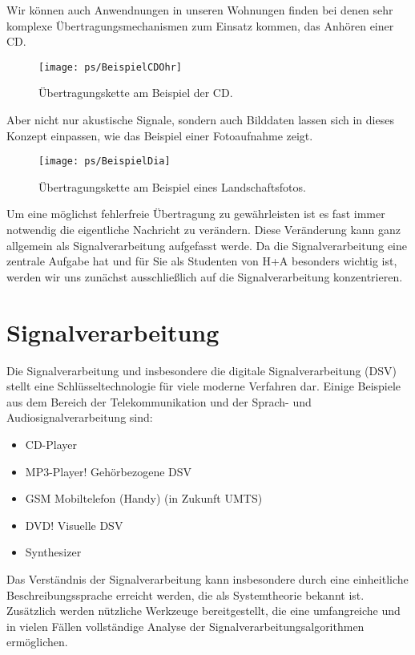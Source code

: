 Wir können auch Anwendnungen in unseren Wohnungen finden bei denen sehr komplexe
Übertragungsmechanismen zum Einsatz kommen, \zB das Anhören einer
CD.
\begin{figure}[H]
\begin{center}
\texttt{[image: ps/BeispielCDOhr]}
\caption{\label{pic:BeispielCDOhr} Übertragungskette am Beispiel
der CD.}
\end{center}
\end{figure}

Aber nicht nur akustische Signale, sondern auch Bilddaten lassen sich in dieses Konzept einpassen,
wie das Beispiel einer Fotoaufnahme zeigt.
\begin{figure}[H]
\begin{center}
\texttt{[image: ps/BeispielDia]}
\caption{\label{pic:BeispielDia} Übertragungskette am Beispiel
eines Landschaftsfotos.}
\end{center}
\end{figure}

Um eine möglichst fehlerfreie Übertragung zu gewährleisten ist es fast immer
notwendig die eigentliche Nachricht zu verändern. Diese
Veränderung kann ganz allgemein als Signalverarbeitung aufgefasst
werde. Da die Signalverarbeitung eine zentrale Aufgabe hat und für
Sie als Studenten von H+A besonders wichtig ist, werden wir uns
zunächst ausschließlich auf die Signalverarbeitung konzentrieren.

\section{Signalverarbeitung}
Die Signalverarbeitung und insbesondere die digitale Signalverarbeitung (DSV) stellt
eine Schlüsseltechnologie für viele moderne Verfahren dar.
Einige Beispiele aus dem Bereich der Telekommunikation und der Sprach- und Audiosignalverarbeitung
sind:
\begin{itemize}
    \item CD-Player
    \item MP3-Player! Gehörbezogene DSV
    \item GSM Mobiltelefon (Handy) (in Zukunft UMTS)
    \item DVD! Visuelle DSV
    \item Synthesizer
\end{itemize}

Das Verständnis der Signalverarbeitung kann insbesondere durch eine einheitliche
Beschreibungssprache erreicht werden, die als Systemtheorie bekannt ist.
Zusätzlich werden nützliche Werkzeuge bereitgestellt, die
eine umfangreiche und in vielen Fällen vollständige
Analyse der Signalverarbeitungsalgorithmen ermöglichen.

